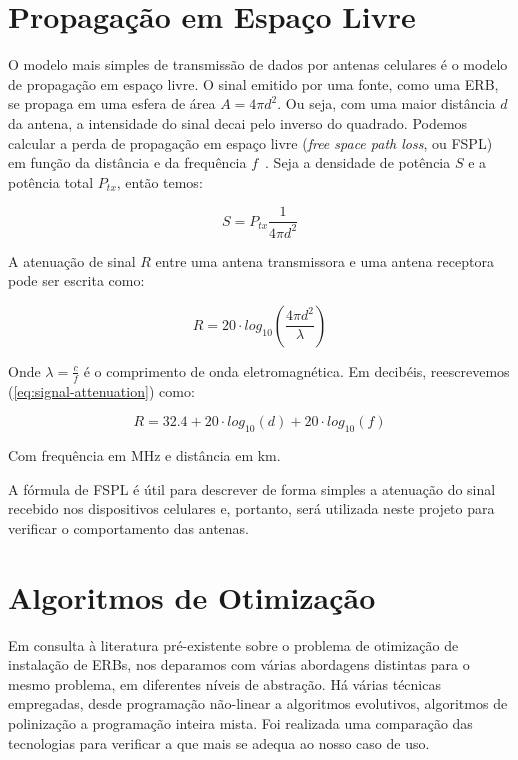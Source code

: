 \documentclass[]{politex}
\begin{document}
\section{Propagação em Espaço Livre}

O modelo mais simples de transmissão de dados por antenas celulares é o modelo
de propagação em espaço livre. O sinal emitido por uma fonte, como uma ERB, se
propaga em uma esfera de área $A = 4\pi d^2$. Ou seja, com uma maior distância
$d$ da antena, a intensidade do sinal decai pelo inverso do quadrado. Podemos
calcular a perda de propagação em espaço livre (\textit{free space path loss},
ou FSPL) em função da distância e da frequência $f$~\cite{rf-design}. Seja a
densidade de potência $S$ e a potência total $P_{tx}$, então temos:

\begin{equation}
    S = P_{tx} \frac{1}{4\pi d^2}
\end{equation}

A atenuação de sinal $R$ entre uma antena transmissora e uma antena receptora
pode ser escrita como:

\begin{equation}\label{eq:signal-attenuation}
    R = 20\cdot log_{10} \left( \frac{4\pi d^2}{\lambda} \right)
\end{equation}

Onde $\lambda = \frac{c}{f}$ é o comprimento de onda eletromagnética. Em
decibéis, reescrevemos (\ref{eq:signal-attenuation}) como:

\begin{equation}
    R = 32.4 + 20\cdot log_{10}(d) + 20\cdot log_{10}(f)
\end{equation}

Com frequência em MHz e distância em km.

A fórmula de FSPL é útil para descrever de forma simples a atenuação do sinal
recebido nos dispositivos celulares e, portanto, será utilizada neste projeto
para verificar o comportamento das antenas.

\section{Algoritmos de Otimização}

Em consulta à literatura pré-existente sobre o problema de otimização de
instalação de ERBs, nos deparamos com várias abordagens distintas para o mesmo
problema, em diferentes níveis de abstração. Há várias técnicas empregadas,
desde programação não-linear a algoritmos evolutivos, algoritmos de polinização
a programação inteira mista. Foi realizada uma comparação das tecnologias para
verificar a que mais se adequa ao nosso caso de uso.
\end{document}
